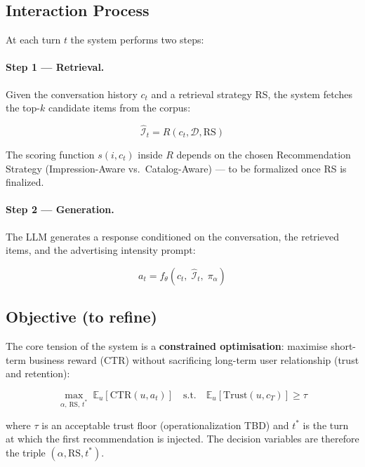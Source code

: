 \documentclass{article}
\begin{document}
\subsection{Interaction Process}
 
At each turn $t$ the system performs two steps:
 
\paragraph{Step 1 — Retrieval.} Given the conversation history $c_t$ and a retrieval strategy RS, the system fetches the top-$k$ candidate items from the corpus:
 
\begin{equation}
    \hat{\mathcal{I}}_t = R(c_t, \mathcal{D}, \text{RS})
\end{equation}
 
The scoring function $s(i, c_t)$ inside $R$ depends on the chosen Recommendation Strategy (Impression-Aware vs.\ Catalog-Aware) — to be formalized once RS is finalized.
 
\paragraph{Step 2 — Generation.} The LLM generates a response conditioned on the conversation, the retrieved items, and the advertising intensity prompt:
 
\begin{equation}
    a_t = f_\theta\!\left(c_t,\; \hat{\mathcal{I}}_t,\; \pi_\alpha\right)
\end{equation}
 
\subsection{Objective (to refine)}
 
The core tension of the system is a \textbf{constrained optimisation}: maximise short-term business reward (CTR) without sacrificing long-term user relationship (trust and retention):
 
\begin{equation}
    \max_{\alpha,\, \text{RS},\, t^*}\; \mathbb{E}_{u}\!\left[\text{CTR}(u, a_t)\right]
    \quad \text{s.t.} \quad
    \mathbb{E}_{u}\!\left[\text{Trust}(u, c_T)\right] \geq \tau
\end{equation}
 
where $\tau$ is an acceptable trust floor (operationalization TBD) and $t^*$ is the turn at which the first recommendation is injected. The decision variables are therefore the triple $(\alpha, \text{RS}, t^*)$.
 
\end{document}
